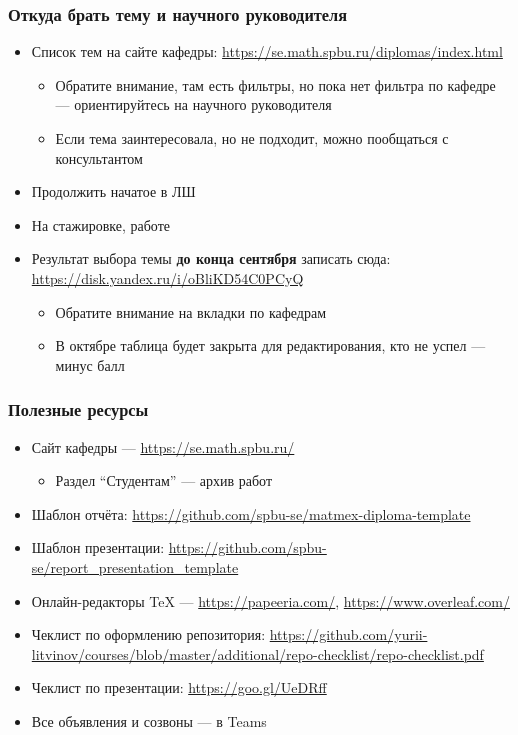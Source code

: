 \documentclass{../../slides-style}
\begin{document}
    \begin{frame}
        \frametitle{Откуда брать тему и научного руководителя}
        \begin{itemize}
            \item Список тем на сайте кафедры: \url{https://se.math.spbu.ru/diplomas/index.html}
            \begin{itemize}
                \item Обратите внимание, там есть фильтры, но пока нет фильтра по кафедре --- ориентируйтесь на научного руководителя
                \item Если тема заинтересовала, но не подходит, можно пообщаться с консультантом
            \end{itemize}
            \item Продолжить начатое в ЛШ
            \item На стажировке, работе
            \item Результат выбора темы \textbf{до конца сентября} записать сюда: \url{https://disk.yandex.ru/i/oBliKD54C0PCyQ}
            \begin{itemize}
                \item Обратите внимание на вкладки по кафедрам
                \item В октябре таблица будет закрыта для редактирования, кто не успел --- минус балл
            \end{itemize}
        \end{itemize}
    \end{frame}

    \begin{frame}
        \frametitle{Полезные ресурсы}
        \begin{itemize}
            \item Сайт кафедры --- \url{https://se.math.spbu.ru/}
            \begin{itemize}
                \item Раздел ``Студентам'' --- архив работ
            \end{itemize}
            \item Шаблон отчёта: \url{https://github.com/spbu-se/matmex-diploma-template}
            \item Шаблон презентации: \url{https://github.com/spbu-se/report_presentation_template}
            \item Онлайн-редакторы TeX --- \url{https://papeeria.com/}, \url{https://www.overleaf.com/}
            \item Чеклист по оформлению репозитория: \url{https://github.com/yurii-litvinov/courses/blob/master/additional/repo-checklist/repo-checklist.pdf}
            \item Чеклист по презентации: \url{https://goo.gl/UeDRff}
            \item Все объявления и созвоны --- в Teams
        \end{itemize}
    \end{frame}
\end{document}
